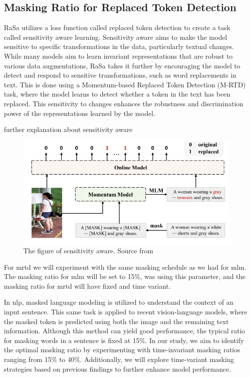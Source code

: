 \subsection{Masking Ratio for Replaced Token Detection}
RaSa utilizes a loss function called replaced token detection to create a task called sensitivity aware learning.
Sensitivity aware aims to make the model sensitive to specific transformations in the data, particularly textual changes. While many models aim to learn invariant representations that are robust to various data augmentations, RaSa takes it further by encouraging the model to detect and respond to sensitive transformations, such as word replacements in text. This is done using a Momentum-based Replaced Token Detection (M-RTD) task, where the model learns to detect whether a token in the text has been replaced. This sensitivity to changes enhances the robustness and discrimination power of the representations learned by the model.

{\color{red}further explanation about sensitivity aware}
\begin{figure}[htbp]
  \includegraphics[width=\linewidth]{img/rasa_sensitivity_aware.png}
  \caption{The figure of sensitivity aware. Source from \cite{Bai2023RaSaRA} }
  \label{img:rasa_sa}
\end{figure}

For \acrshort{mrtd} we will experiment with the same masking schedule as we had for \acrshort{mlm}. The masking ratio for \acrshort{mlm} will be set to 15\%, \cite{Bai2023RaSaRA} was using this parameter, and the masking ratio for \acrshort{mrtd} will have fixed and time variant.

In \acrshort{nlp}, masked language modeling is utilized to understand the context of an input sentence. This same task is applied to recent vision-language models, where the masked token is predicted using both the image and the remaining text information. Although this method can yield good performance, the typical ratio for masking words in a sentence is fixed at 15\%. 
In our study, we aim to identify the optimal masking ratio by experimenting with time-invariant masking ratios ranging from 15\% to 40\%. Additionally, we will explore time-variant masking strategies based on previous findings to further enhance model performance.

